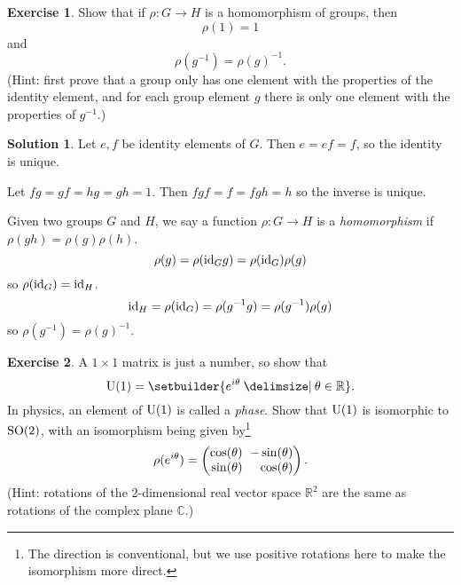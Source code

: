 \documentclass[11pt, a4paper]{report}
\theoremstyle{definition}
\newtheorem{exercise}{Exercise}[part]
\newtheorem{solution}{Solution}[part]
\newenvironment{ex}{\begin{exercise}}{\end{exercise}\pagebreak[1]}
\newenvironment{sol}{\begin{solution}}{\end{solution}\pagebreak[3]}
\newcommand*{\settightmatrix}{\ensuremath\setlength{\arraycolsep}{0.7ex}}
\newcommand*{\SO}{\ensuremath\text{SO}}
\newcommand*{\U}{\ensuremath\text{U}}
\newcommand*{\id}{\ensuremath\mathop{}\mathopen{}\mathrm{id}}
\begin{document}
\begin{ex}

Show that if $\rho: G \to H$ is a homomorphism of groups, then
\[
    \rho(1) = 1
\]
and
\[
    \rho(g^{-1}) = {\rho(g)}^{-1}.
\]
(Hint: first prove that a group only has one element with the properties of the identity element, and for each group element $g$ there is only one element with the properties of $g^{-1}$.)

\end{ex}

\begin{sol}

Let $e, f$ be identity elements of $G$. Then $e = ef = f$, so the identity is unique.

Let $fg = gf = hg = gh = 1$. Then $fgf = f = fgh = h$ so the inverse is unique.

Given two groups $G$ and $H$, we say a function $\rho: G \to H$ is a \emph{homomorphism} if $\rho(gh) = \rho(g) \rho(h)$.
\[
    \rho(g) = \rho(\id_G g) = \rho(\id_G) \rho(g)
\]
so $\rho(\id_G) = \id_H$.
\[
    \id_H = \rho(\id_G) = \rho(g^{-1} g) = \rho(g^{-1}) \rho(g)
\]
so $\rho(g^{-1}) = {\rho(g)}^{-1}$.

\end{sol}

\begin{ex}

A $1 \times 1$ matrix is just a number, so show that
\[
    \U(1) = \setbuilder{e^{i\theta} \given \theta \in \mathbb{R}}.
\]
In physics, an element of $\U(1)$ is called a \emph{phase}.
Show that $\U(1)$ is isomorphic to $\SO(2)$, with an isomorphism being given by\footnote{The direction is conventional, but we use positive rotations here to make the isomorphism more direct.}
\[
    \settightmatrix
    \rho(e^{i\theta}) =
        \begin{pmatrix*}[r]
            \cos(\theta) & -\sin(\theta) \\
            \sin(\theta) & \cos(\theta)
        \end{pmatrix*}.
\]
(Hint: rotations of the 2-dimensional real vector space $\mathbb{R}^2$ are the same as rotations of the complex plane $\mathbb{C}$.)

\end{ex}
\end{document}
